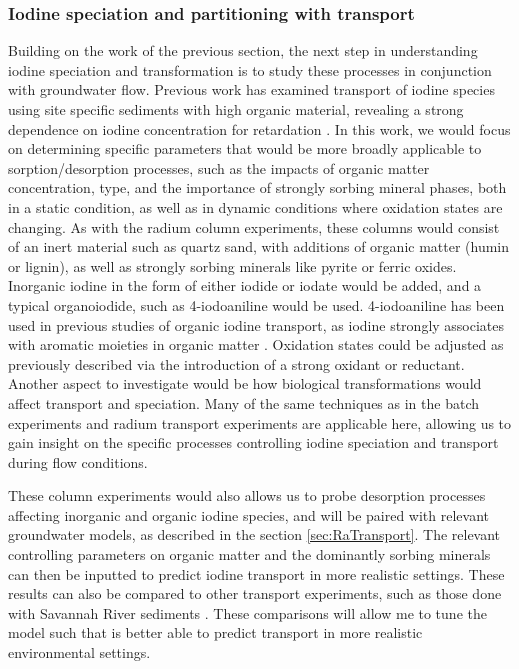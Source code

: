 \documentclass[twoside,12pt,titlepage]{article}
\begin{document}
\subsubsection{Iodine speciation and partitioning with transport}
Building on the work of the previous section, the next step in understanding iodine speciation and transformation is to study these processes in conjunction with groundwater flow. Previous work has examined transport of iodine species using site specific sediments with high organic material, revealing a strong dependence on iodine concentration for retardation \cite{Zhang2011}. In this work, we would focus on determining specific parameters that would be more broadly applicable to sorption/desorption processes, such as the impacts of organic matter concentration, type, and the importance of strongly sorbing mineral phases, both in a static condition, as well as in dynamic conditions where oxidation states are changing. As with the radium column experiments, these columns would consist of an inert material such as quartz sand, with additions of organic matter (humin or lignin), as well as strongly sorbing minerals like pyrite or ferric oxides. Inorganic iodine in the form of either iodide or iodate would be added, and a typical organoiodide, such as 4-iodoaniline would be used. 4-iodoaniline has been used in previous studies of organic iodine transport, as iodine strongly associates with aromatic moieties in organic matter \cite{Kaplan2014}. Oxidation states could be adjusted as previously described via the introduction of a strong oxidant or reductant. Another aspect to investigate would be how biological transformations would affect transport and speciation. Many of the same techniques as in the batch experiments and radium transport experiments are applicable here, allowing us to gain insight on the specific processes controlling iodine speciation and transport during flow conditions.
\par These column experiments would also allows us to probe desorption processes affecting inorganic and organic iodine species, and will be paired with relevant groundwater models, as described in the section \ref{sec:RaTransport}. The relevant controlling parameters on organic matter and the dominantly sorbing minerals can then be inputted to predict iodine transport in more realistic settings. These results can also be compared to other transport experiments, such as those done with Savannah River sediments \cite{Zhang2011}. These comparisons will allow me to tune the model such that is better able to predict transport in more realistic environmental settings.
\end{document}
